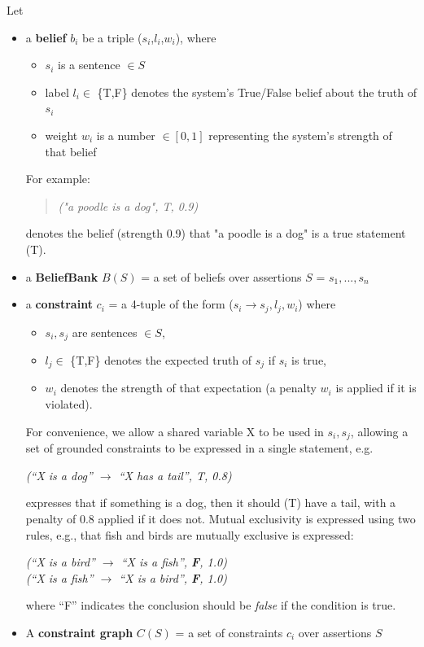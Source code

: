 \documentclass[11pt]{article}
\newcommand{\nk}[1]{\textcolor{green}{Nora: #1}}
\newcommand{\red}[1]{\textcolor{red}{#1}}
\newenvironment{myquote}{                   %
  \parskip 0mm \begin{quoting}[vskip=0mm,leftmargin=2mm]}{
\end{quoting}}
\newenvironment{ite}{                     %
     \parskip 0cm \begin{itemize} \parskip 0cm \parsep 0cm \itemsep 0cm \topsep 0cm}{
        \end{itemize}} %
\begin{document}
\noindent Let
\vspace{-2mm}
\begin{ite}
  \item a {\bf belief} $b_i$ be a triple ($s_i$,$l_i$,$w_i$), where 
     \begin{ite}
     \item $s_i$ is a sentence $\in S$ %
      \item label $l_i \in$ \{T,F\} denotes the system's True/False belief about the truth of $s_i$
     \item weight $w_i$ is a number $\in [0,1]$ representing the system's strength of that belief
    \end{ite}
 For example:
 \begin{quote}
{\it      ("a poodle is a dog", T, 0.9) }
 \end{quote} 
 denotes the belief (strength 0.9) that "a poodle is a dog" is a true statement (T).
  \item a {\bf BeliefBank} $B(S)$ = a set of beliefs over assertions $S$ = $s_1,...,s_n$
 \item a {\bf constraint} $c_i$ = a 4-tuple of the form 
($s_i \rightarrow s_j, l_j, w_i$)
where 
\begin{ite}
\item $s_i,s_j$ are sentences $\in S$, 
\item $l_j \in$ \{T,F\} denotes the expected truth of $s_j$ if $s_i$ is true,
\item $w_i$ denotes the strength of that expectation (a penalty $w_i$ is applied if it is violated). 
\end{ite}
For convenience, we allow a shared variable X to be used in $s_i,s_j$, allowing a set of grounded
constraints to be expressed in a single statement, e.g.
\begin{myquote}
{\it (``X is a dog'' $\rightarrow$ ``X has a tail'', T, 0.8) }
\end{myquote}
expresses that if something is a dog, then it should (T) have a tail, with a penalty of 0.8 applied if
it does not. Mutual exclusivity is expressed using two rules, e.g., that fish and birds are mutually exclusive
is expressed:
\begin{myquote}
{\it (``X is a bird'' $\rightarrow$ ``X is a fish'', {\bf F}, 1.0) } \\
{\it (``X is a fish'' $\rightarrow$ ``X is a bird'', {\bf F}, 1.0) }
\end{myquote}
where ``F'' indicates the conclusion should be {\it false} if the condition is true.
\item A {\bf constraint graph} $C(S)$ = a set of constraints $c_i$ over assertions $S$ 
\end{ite}
\end{document}
